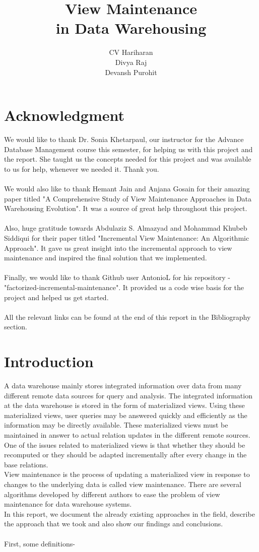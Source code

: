 \documentclass[12pt]{report}
\title{\textbf{\Huge View Maintenance \\ in Data Warehousing } }
\author{CV Hariharan \bullet 1610110147 \\ Divya Raj \bullet 1610110123 \\ Devansh Purohit \bullet 1610110116}
\date{}
\begin{document}
\maketitle
\section*{Acknowledgment}
We would like to thank Dr. Sonia Khetarpaul, our instructor for the Advance Database Management course this semester, for helping us with this project and the report. She taught us the concepts needed for this project and was available to us for help, whenever we needed it. Thank you.\\
\\We would also like to thank Hemant Jain and Anjana Gosain for their amazing paper titled "A Comprehensive Study of View Maintenance Approaches in 
Data Warehousing Evolution". It was a source of great help throughout this project. \\
\\Also, huge gratitude towards Abdulaziz S. Almazyad and Mohammad Khubeb Siddiqui for their paper titled "Incremental View Maintenance: An Algorithmic 
Approach". It gave us great insight into the incremental approach to view maintenance and inspired the final solution that we implemented.
\\\\Finally, we would like to thank Github user AntonioL for his repository -  "factorized-incremental-maintenance". It provided us a code wise basis for the project and helped us get started.
\\\\All the relevant links can be found at the end of this report in the Bibliography section.
\tableofcontents
\newpage
\renewcommand{\thesection}{\arabic{section}}
\section{Introduction}
A data warehouse mainly stores integrated information over data from 
many different remote data sources for query and analysis. The 
integrated information at the data warehouse is stored in the form of 
materialized views. Using these materialized views, user queries may be 
answered quickly and efficiently as the information may be directly 
available. These materialized views must be maintained in answer to 
actual relation updates in the different remote sources. \\
One of the issues 
related to materialized views is that whether they should be recomputed 
or they should be adapted incrementally after every change in the base 
relations. \\
View maintenance is the process of updating a materialized 
view in response to changes to the underlying data is called view 
maintenance. There are several algorithms developed by different 
authors to ease the problem of view maintenance for data warehouse 
systems. \cite{basic} \\
In this report, we document the already existing approaches in the field, describe the approach that we took and also show our findings and conclusions. 
\\\\First, some definitions-
\end{document}
